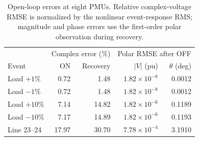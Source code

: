\begin{table}[t]
\centering\small
\caption{Open-loop errors at eight PMUs. Relative complex-voltage RMSE is normalized by the nonlinear event-response RMS; magnitude and phase errors use the first-order polar observation during recovery.}
\label{tab:descriptor-bridge}
\begin{tabular}{lrrrr}
\toprule
&\multicolumn{2}{c}{Complex error (\%)}&\multicolumn{2}{c}{Polar RMSE after OFF}\\
Event&ON&Recovery&$|V|$ (pu)&$\theta$ (deg)\\
\midrule
Load $+1\%$&0.72&1.48&$1.82\!\times\!10^{-8}$&0.0012\\
Load $-1\%$&0.72&1.48&$1.82\!\times\!10^{-8}$&0.0012\\
Load $+10\%$&7.14&14.82&$1.82\!\times\!10^{-6}$&0.1189\\
Load $-10\%$&7.17&14.89&$1.82\!\times\!10^{-6}$&0.1193\\
Line 23--24&17.97&30.70&$7.78\!\times\!10^{-4}$&3.1910\\
\bottomrule
\end{tabular}
\end{table}
